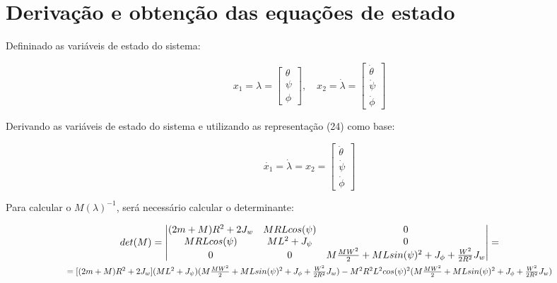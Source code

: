 \documentclass[10pt]{article}
\begin{document}
\section{Derivação e obtenção das equações de estado}

\quad Defininado as variáveis de estado do sistema:

\begin{equation}
    x_1 = \lambda =
    \begin{bmatrix}
        \theta \\
        \psi \\
        \phi
    \end{bmatrix}, \quad
    x_2 = \dot\lambda = 
    \begin{bmatrix}
        \dot\theta \\
        \dot\psi \\
        \dot\phi
    \end{bmatrix}
\end{equation}

\quad Derivando as variáveis de estado do sistema e utilizando as representação (24) como base:

\begin{equation}
    \dot{x_1} = \dot\lambda = x_2 =
    \begin{bmatrix}
        \dot\theta \\
        \dot\psi \\
        \dot\phi
    \end{bmatrix}
\end{equation}

\quad Para calcular o $M(\lambda)^{-1}$, será necessário calcular o determinante:

\begin{equation}
\begin{gathered}
    det(M) = 
    \begin{vmatrix}
        (2m + M)R^2 + 2J_w & MRLcos(\psi) & 0 \\
        MRLcos(\psi) & ML^2 + J_\psi & 0 \\
        0 & 0 & M\frac{MW^2}{2} + MLsin(\psi)^2 + J_\phi + \frac{W^2}{2R^2}J_w \\
    \end{vmatrix} = \\
    \scalebox{0.85}{$
    = [(2m + M)R^2 + 2J_w](ML^2 + J_\psi)(M\frac{MW^2}{2} + MLsin(\psi)^2 + J_\phi + \frac{W^2}{2R^2}J_w) -  M^2R^2L^2cos(\psi)^2(M\frac{MW^2}{2} + MLsin(\psi)^2 + J_\phi + \frac{W^2}{2R^2}J_w)
    $}
\end{gathered}
\end{equation}
\end{document}
